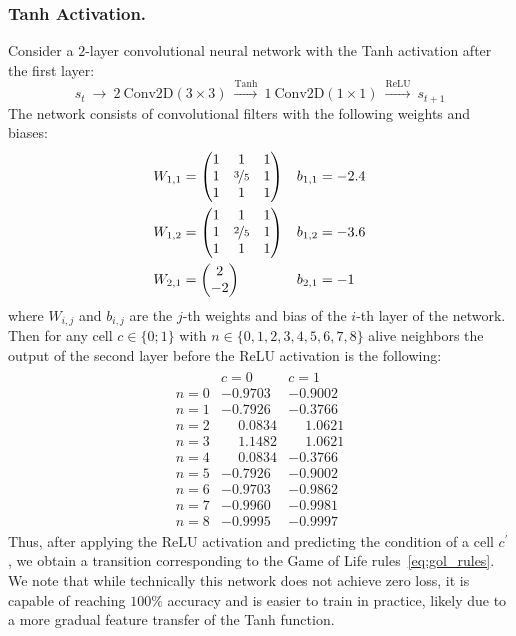 \documentclass[letterpaper]{article} %
\begin{document}
\subsubsection{Tanh Activation.}
Consider a $2$-layer convolutional neural network with the Tanh activation after the first layer:
\[
    s_t \ \to\ 
    2\ \text{Conv2D}(3 \times 3) \ \xrightarrow{\text{Tanh}}\ 
    1\ \text{Conv2D}(1 \times 1) \ \xrightarrow{\text{ReLU}}\ 
    s_{t+1}
\]
The network consists of convolutional filters with the following weights and biases:
\begin{align*}
    W_{1,1} &= \begin{pmatrix}
        1 & 1 & 1
        \\
        1 & \nicefrac{3}{5} & 1
        \\
        1 & 1 & 1
    \end{pmatrix}
    &
    b_{1,1} &= -2.4
    \\
    W_{1,2} &= \begin{pmatrix}
        1 & 1 & 1
        \\
        1 & \nicefrac{2}{5} & 1
        \\
        1 & 1 & 1
    \end{pmatrix}
    &
    b_{1,2} &= -3.6
    \\
    W_{2,1} &= \begin{pmatrix} 2 \\ -2 \end{pmatrix}
    &
    b_{2,1} &= -1
\end{align*}
where $W_{i,j}$ and $b_{i,j}$ are the $j$-th weights and bias of the $i$-th layer of the network.
Then for any cell $c \in \{0;1\}$ with $n \in \{0,1,2,3,4,5,6,7,8\}$ alive neighbors the output of the second layer before the ReLU activation is the following:
\begin{gather*}
    \begin{array}{c|cc}
        & c = 0 & c = 1
        \\\hline
        n = 0 & -0.9703 & -0.9002
        \\
        n = 1 & -0.7926 & -0.3766
        \\
        n = 2 & \phantom{-}0.0834 & \phantom{-}1.0621
        \\
        n = 3 & \phantom{-}1.1482 & \phantom{-}1.0621
        \\
        n = 4 & \phantom{-}0.0834 & -0.3766
        \\
        n = 5 & -0.7926 & -0.9002
        \\
        n = 6 & -0.9703 & -0.9862
        \\
        n = 7 & -0.9960 & -0.9981
        \\
        n = 8 & -0.9995 & -0.9997
    \end{array}
\end{gather*}
Thus, after applying the ReLU activation and predicting the condition of a cell $c^\prime$, we obtain a transition corresponding to the Game of Life rules~\eqref{eq:gol_rules}.
We note that while technically this network does not achieve zero loss, it is capable of reaching $100\%$ accuracy and is easier to train in practice, likely due to a more gradual feature transfer of the Tanh function.
\end{document}
